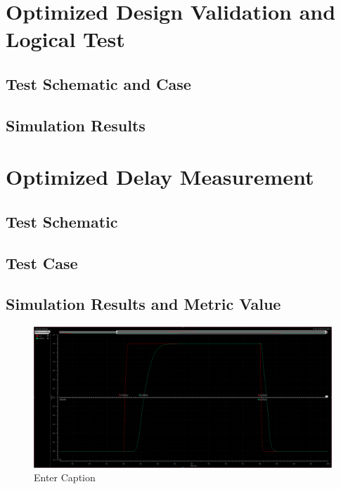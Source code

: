 \documentclass[12pt]{article}
\begin{document}
\newpage

\section{Optimized Design Validation and Logical Test}
\subsection{Test Schematic and Case}



\newpage

\subsection{Simulation Results}



\newpage

\section{Optimized Delay Measurement}
\subsection{Test Schematic}



\newpage

\subsection{Test Case}



\newpage

\subsection{Simulation Results and Metric Value}

\begin{figure}[H]
    \centering
    \includegraphics[width=0.5\linewidth]{writeup//figures/optimized_delay_transient.png}
    \caption{Enter Caption}
\end{figure}
\end{document}
